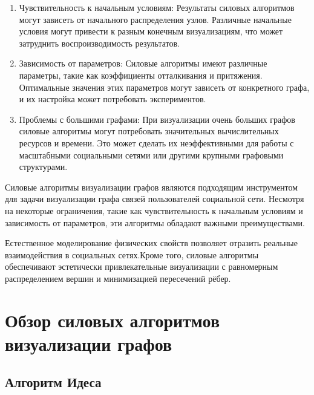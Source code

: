 \documentclass[14pt, russian]{scrartcl}
\begin{document}
\begin{enumerate}
  \item{Чувствительность к начальным условиям: Результаты силовых алгоритмов могут зависеть от начального распределения узлов. Различные начальные условия могут привести к разным конечным визуализациям, что может затруднить воспроизводимость результатов.}
  \item{Зависимость от параметров: Силовые алгоритмы имеют различные параметры, такие как коэффициенты отталкивания и притяжения. Оптимальные значения этих параметров могут зависеть от конкретного графа, и их настройка может потребовать экспериментов.}
  \item{Проблемы с большими графами:
При визуализации очень больших графов силовые алгоритмы могут потребовать значительных вычислительных ресурсов и времени. Это может сделать их неэффективными для работы с масштабными социальными сетями или другими крупными графовыми структурами.}
\end{enumerate}

Силовые алгоритмы визуализации графов являются подходящим инструментом для задачи визуализации графа связей пользователей социальной сети. Несмотря на некоторые ограничения, такие как чувствительность к начальным условиям и зависимость от параметров, эти алгоритмы обладают важными преимуществами.

Естественное моделирование физических свойств позволяет отразить реальные взаимодействия в социальных сетях.Кроме того, силовые алгоритмы обеспечивают эстетически привлекательные визуализации с равномерным распределением вершин и минимизацией пересечений рёбер.



\section{Обзор силовых алгоритмов визуализации графов}

\subsection{Алгоритм Идеса}
\end{document}
